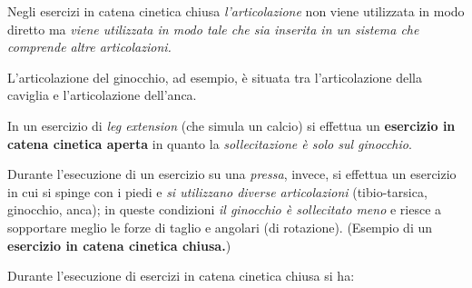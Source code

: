 Negli esercizi in catena cinetica chiusa \emph{l'articolazione} non
viene utilizzata in modo diretto ma \emph{viene utilizzata in modo tale
che sia inserita in un sistema che comprende altre articolazioni. }

L'articolazione del ginocchio, ad esempio, è situata tra l'articolazione
della caviglia e l'articolazione dell'anca.

In un esercizio di \emph{leg extension} (che simula un calcio) si
effettua un \textbf{esercizio in catena cinetica aperta} in quanto la
\emph{sollecitazione è solo sul ginocchio}.

Durante l'esecuzione di un esercizio su una \emph{pressa}, invece, si
effettua un esercizio in cui si spinge con i piedi e \emph{si utilizzano
diverse articolazioni} (tibio-tarsica, ginocchio, anca); in queste
condizioni \emph{il ginocchio è sollecitato meno} e riesce a sopportare
meglio le forze di taglio e angolari (di rotazione). (Esempio di un
\textbf{esercizio in catena cinetica chiusa.})

Durante l'esecuzione di esercizi in catena cinetica chiusa si ha:

